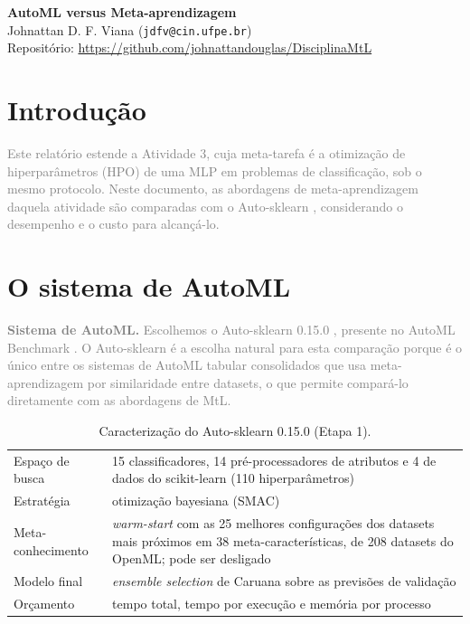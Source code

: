 \documentclass[10pt]{article}
\newcommand{\pend}[1]{}
\newcommand{\editinst}[1]{\textcolor{gray}{#1}}
\begin{document}
\begin{center}
    {\large\textbf{AutoML versus Meta-aprendizagem}}\\[0.5em]
    Johnattan D. F. Viana (\texttt{jdfv@cin.ufpe.br})\\
    Repositório: \url{https://github.com/johnattandouglas/DisciplinaMtL}
\end{center}


\section{Introdução}

\editinst{Este relatório estende a Atividade 3, cuja meta-tarefa é a otimização de hiperparâmetros (HPO) de uma MLP em problemas de classificação, sob o mesmo protocolo. Neste documento, as abordagens de meta-aprendizagem daquela atividade são comparadas com o Auto-sklearn \cite{feurerautosklearn}, considerando o desempenho e o custo para alcançá-lo.}

\section{O sistema de AutoML}\label{sec:sistema}

\editinst{\textbf{Sistema de AutoML.} Escolhemos o Auto-sklearn 0.15.0 \cite{feurerautosklearn}, presente no AutoML Benchmark \cite{gijsbers2024amlb}. \pend{[Citações no Google Scholar e data da consulta, de Entrega4/hpo/JUSTIFICATIVA\_AUTOML.md.]} O Auto-sklearn é a escolha natural para esta comparação porque é o único entre os sistemas de AutoML tabular consolidados que usa meta-aprendizagem por similaridade entre datasets, o que permite compará-lo diretamente com as abordagens de MtL.}

\begin{table}[!htb]
\color{gray}\centering\small
\caption{Caracterização do Auto-sklearn 0.15.0 (Etapa 1).}
\label{tab:sistemas}
\begin{tabular}{p{2.6cm}p{10.5cm}}
\toprule
Espaço de busca & 15 classificadores, 14 pré-processadores de atributos e 4 de dados do scikit-learn (110 hiperparâmetros) \\
Estratégia & otimização bayesiana (SMAC) \\
Meta-conhecimento & \textit{warm-start} com as 25 melhores configurações dos datasets mais próximos em 38 meta-características, de 208 datasets do OpenML; pode ser desligado \\
Modelo final & \textit{ensemble selection} de Caruana \cite{caruana2004ensemble} sobre as previsões de validação \\
Orçamento & tempo total, tempo por execução e memória por processo \\
\bottomrule
\end{tabular}
\end{table}
\end{document}
